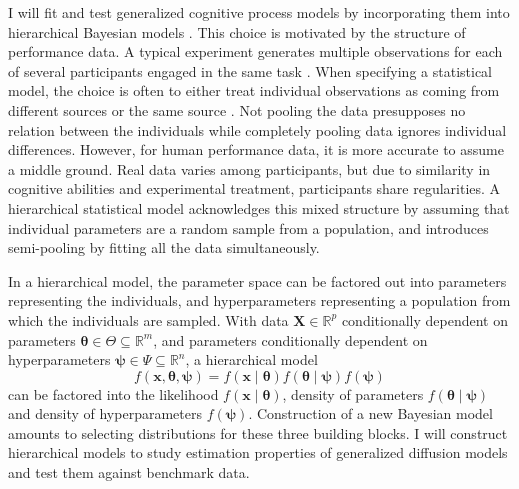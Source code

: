 \documentclass[12pt]{article}
\begin{document}
	I will fit and test generalized cognitive process models by incorporating them into hierarchical Bayesian models \citep{Ber1997,GelCar2013}. This choice is motivated by the structure of performance data. A typical experiment generates multiple observations for each of several participants engaged in the same task \citep{RatMck2008,Wag2009}. When specifying a statistical model, the choice is often to either treat individual observations as coming from different sources or the same source \citep{RouLu2005,RouLu22005,RouMor2014}. Not pooling the data presupposes no relation between the individuals while completely pooling data ignores individual differences. However, for human performance data, it is more accurate to assume a middle ground. Real data varies among participants, but due to similarity in cognitive abilities and experimental treatment, participants share regularities. A hierarchical statistical model acknowledges this mixed structure by assuming that individual parameters are a random sample from a population, and introduces semi-pooling by fitting all the data simultaneously.
    
	In a hierarchical model, the parameter space can be factored out into parameters representing the individuals, and hyperparameters representing a population from which the individuals are sampled. With data $\boldsymbol{X} \in \mathbb{R}^p$ conditionally dependent on parameters $\boldsymbol{\theta} \in \Theta \subseteq \mathbb{R}^m$, and parameters conditionally dependent on hyperparameters $\boldsymbol{\psi} \in \Psi \subseteq \mathbb{R}^n$, a hierarchical model
\begin{equation}
f(\boldsymbol{x}, \boldsymbol{\theta}, \boldsymbol{\psi}) =
f(\boldsymbol{x} \mid \boldsymbol{\theta})
f(\boldsymbol{\theta} \mid \boldsymbol{\psi})
f(\boldsymbol{\psi})
\end{equation}
can be factored into the likelihood $f(\boldsymbol{x} \mid \boldsymbol{\theta})$, density of parameters $f(\boldsymbol{\theta} \mid \boldsymbol{\psi})$ and density of hyperparameters $f(\boldsymbol{\psi})$. Construction of a new Bayesian model amounts to selecting distributions for these three building blocks. I will construct hierarchical models to study estimation properties of generalized diffusion models and test them against benchmark data.

\end{document}
